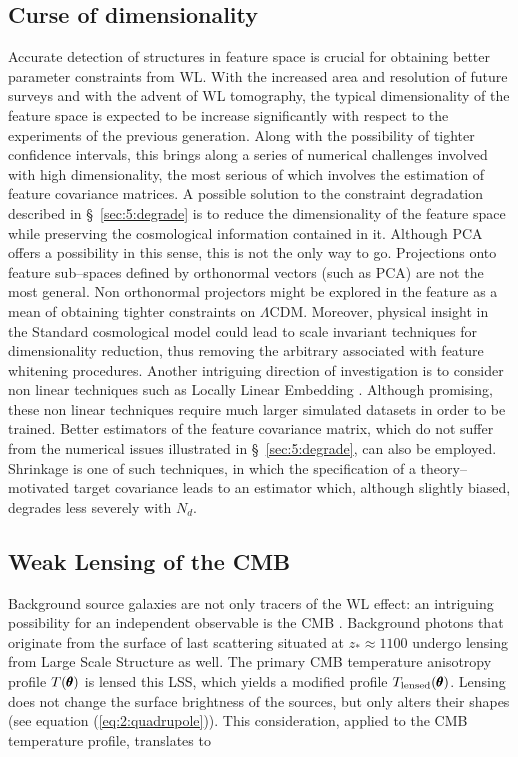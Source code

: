 \subsection{Curse of dimensionality}
Accurate detection of structures in feature space is crucial for obtaining better parameter constraints from WL. With the increased area and resolution of future surveys and with the advent of WL tomography, the typical dimensionality of the feature space is expected to be increase significantly with respect to the experiments of the previous generation. Along with the possibility of tighter confidence intervals, this brings along a series of numerical challenges involved with high dimensionality, the most serious of which involves the estimation of feature covariance matrices. A possible solution to the constraint degradation described in \S~\ref{sec:5:degrade} is to reduce the dimensionality of the feature space while preserving the cosmological information contained in it. Although PCA offers a possibility in this sense, this is not the only way to go. Projections onto feature sub--spaces defined by orthonormal vectors (such as PCA) are not the most general. Non orthonormal projectors might be explored in the feature as a mean of obtaining tighter constraints on $\Lambda$CDM. Moreover, physical insight in the Standard cosmological model could lead to scale invariant techniques for dimensionality reduction, thus removing the arbitrary associated with feature whitening procedures. Another intriguing direction of investigation is to consider non linear techniques such as Locally Linear Embedding \citep{astroMLText}. Although promising, these non linear techniques require much larger simulated datasets in order to be trained. Better estimators of the feature covariance matrix, which do not suffer from the numerical issues illustrated in \S~\ref{sec:5:degrade}, can also be employed. Shrinkage \citep{ShrinkagePope} is one of such techniques, in which the specification of a theory--motivated target covariance leads to an estimator which, although slightly biased, degrades less severely with $N_d$.    

\subsection{Weak Lensing of the CMB}
Background source galaxies are not only tracers of the WL effect: an intriguing possibility for an independent observable is the CMB \citep{CMBLens}. Background photons that originate from the surface of last scattering situated at $z_*\approx 1100$ undergo lensing from Large Scale Structure as well. The primary CMB temperature anisotropy profile $T(\pmb{\theta})$ is lensed this LSS, which yields a modified profile $T_{\rm lensed}(\pmb{\theta})$. Lensing does not change the surface brightness of the sources, but only alters their shapes (see equation (\ref{eq:2:quadrupole})). This consideration, applied to the CMB temperature profile, translates to 

